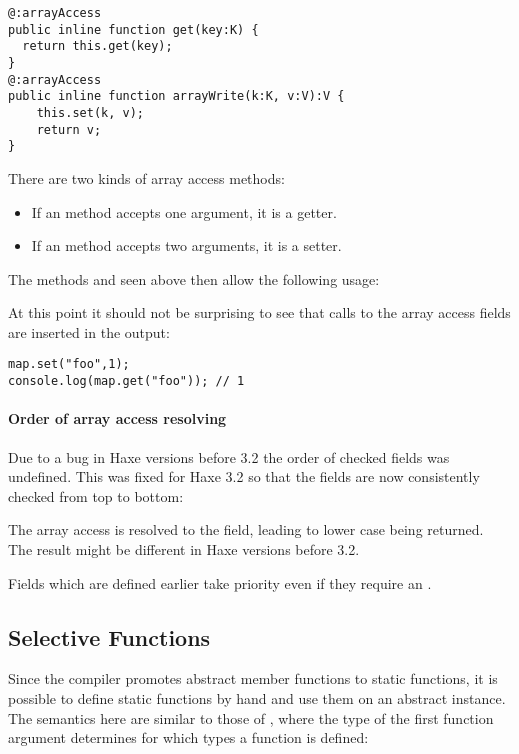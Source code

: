 \begin{lstlisting}
@:arrayAccess
public inline function get(key:K) {
  return this.get(key);
}
@:arrayAccess
public inline function arrayWrite(k:K, v:V):V {
	this.set(k, v);
	return v;
}
\end{lstlisting}
There are two kinds of array access methods:

\begin{itemize}
	\item If an  method accepts one argument, it is a getter.
	\item If an  method accepts two arguments, it is a setter.
\end{itemize}
The methods  and  seen above then allow the following usage:


At this point it should not be surprising to see that calls to the array access fields are inserted in the output:

\begin{lstlisting}
map.set("foo",1);
console.log(map.get("foo")); // 1
\end{lstlisting}

\paragraph{Order of array access resolving}
\label{types-abstract-array-access-order}

Due to a bug in Haxe versions before 3.2 the order of checked  fields was undefined. This was fixed for Haxe 3.2 so that the fields are now consistently checked from top to bottom:


The array access  is resolved to the  field, leading to lower case  being returned. The result might be different in Haxe versions before 3.2.

Fields which are defined earlier take priority even if they require an .


\subsection{Selective Functions}
\label{types-abstract-selective-functions}

Since the compiler promotes abstract member functions to static functions, it is possible to define static functions by hand and use them on an abstract instance. The semantics here are similar to those of , where the type of the first function argument determines for which types a function is defined:

